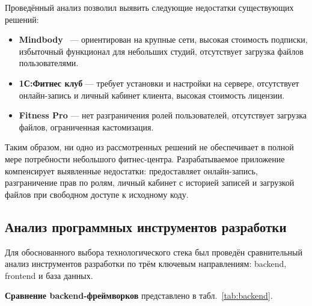 Проведённый анализ позволил выявить следующие недостатки существующих решений:

\begin{itemize}
	\item \textbf{Mindbody}~\cite{mindbody} --- ориентирован на крупные сети,
	      высокая стоимость подписки, избыточный функционал для небольших студий,
	      отсутствует загрузка файлов пользователями.
	\item \textbf{1С:Фитнес клуб} --- требует установки и настройки на сервере,
	      отсутствует онлайн-запись и личный кабинет клиента, высокая стоимость
	      лицензии.
	\item \textbf{Fitness Pro} --- нет разграничения ролей пользователей,
	      отсутствует загрузка файлов, ограниченная кастомизация.
\end{itemize}

Таким образом, ни одно из рассмотренных решений не обеспечивает в полной мере
потребности небольшого фитнес-центра. Разрабатываемое приложение компенсирует
выявленные недостатки: предоставляет онлайн-запись, разграничение прав по ролям,
личный кабинет с историей записей и загрузкой файлов при свободном доступе
к исходному коду.

\subsection{Анализ программных инструментов разработки}

Для обоснованного выбора технологического стека был проведён сравнительный
анализ инструментов разработки по трём ключевым направлениям: backend,
frontend и база данных.

\textbf{Сравнение backend-фреймворков} представлено в табл.~\ref{tab:backend}.

